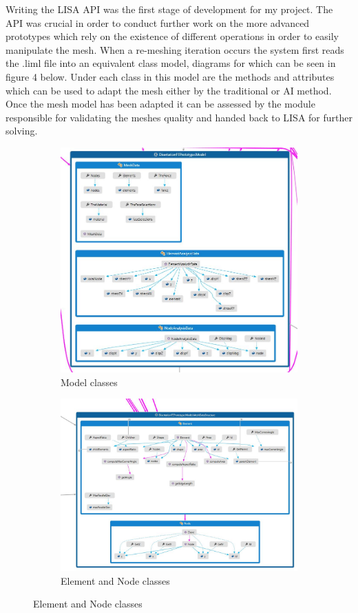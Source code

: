 \documentclass{article}
\begin{document}
Writing the LISA API was the first stage of development for my project. The API was crucial in order to conduct further work on the more advanced prototypes which rely on the existence of different operations in order to easily manipulate the mesh. When a re-meshing iteration occurs the system first reads the .liml file into an equivalent class model, diagrams for which can be seen in figure 4 below. Under each class in this model are the methods and attributes which can be used to adapt the mesh either by the traditional or AI method. Once the mesh model has been adapted it can be assessed by the module responsible for validating the meshes quality and handed back to LISA for further solving.\\
\begin{figure}[!h]
\centering
\begin{subfigure}{.5\textwidth}
  \centering
  \includegraphics[width=0.9\linewidth]{DissoFEProto-Model.jpg}
  \caption{Model classes}
  \label{fig:sub1}
\end{subfigure}%
\begin{subfigure}{.5\textwidth}
  \centering
  \includegraphics[width=0.9\linewidth]{DissoFEProto-ElemNode.jpg}
  \caption{Element and Node classes}
  \label{fig:sub2}
\end{subfigure}
\label{fig:test}
\end{figure}
\end{document}
